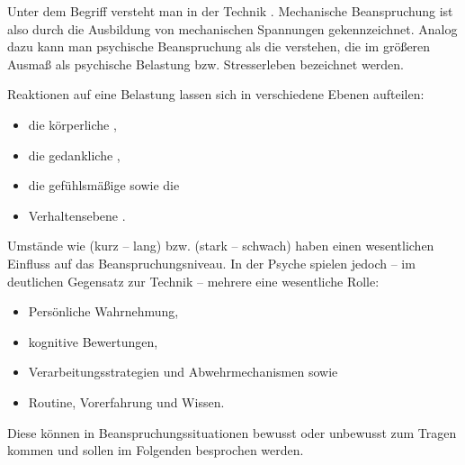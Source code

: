 \Text
{{\TxBeschreibung}}%
{%
\label{topic:beanspruchung-psi}
\label{topic:belastung-psi}

Unter dem Begriff  versteht man in der
Technik 
\cite{wiki:beanspruchung20110814}. Mechanische Beanspruchung
ist also durch die Ausbildung von mechanischen Spannungen
gekennzeichnet. Analog dazu kann man psychische
Beanspruchung als die  verstehen, die im größeren Ausmaß als
psychische Belastung bzw.
Stresserleben bezeichnet werden. 


Reaktionen auf eine
Belastung lassen sich in verschiedene
Ebenen aufteilen: 
\begin{itemize}
  \item die körperliche ,
  \item die gedankliche ,
  \item die gefühlsmäßige  sowie die
  \item Verhaltensebene . 
\end{itemize}



Umstände wie
 (kurz -- lang) bzw. 
 (stark -- schwach) haben einen wesentlichen
Einfluss auf das Beanspruchungsniveau. In der Psyche
spielen jedoch -- im deutlichen Gegensatz zur Technik --
mehrere  eine wesentliche Rolle: 

\begin{itemize}
  \item Persönliche Wahrnehmung,  
  \item kognitive Bewertungen, 
  \item Verarbeitungsstrategien und Abwehrmechanismen sowie
  \item Routine, Vorerfahrung und Wissen. 
\end{itemize}



Diese können in
Beanspruchungssituationen bewusst oder unbewusst zum Tragen
kommen und sollen im Folgenden besprochen werden.
}%

